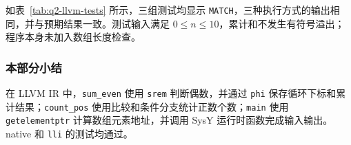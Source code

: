 如表~\ref{tab:q2-llvm-tests} 所示，三组测试均显示 \texttt{MATCH}，三种执行方式的输出相同，并与预期结果一致。测试输入满足 $0\leq n\leq 10$，累计和不发生有符号溢出；程序本身未加入数组长度检查。

\subsubsection{本部分小结}

在 LLVM IR 中，\texttt{sum\_even} 使用 \texttt{srem} 判断偶数，并通过 \texttt{phi} 保存循环下标和累计结果；\texttt{count\_pos} 使用比较和条件分支统计正数个数；\texttt{main} 使用 \texttt{getelementptr} 计算数组元素地址，并调用 SysY 运行时函数完成输入输出。native 和 \texttt{lli} 的测试均通过。
